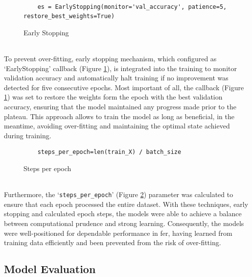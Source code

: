 \\
\begin{figure}[h!] 
    \centering
\begin{verbatim}
    es = EarlyStopping(monitor='val_accuracy', patience=5, restore_best_weights=True)
\end{verbatim}
    \caption{Early Stopping}
    \label{fig:earlystopping}
\end{figure}
\\
\indent To prevent over-fitting, early stopping mechanism, which configured as `EarlyStopping' callback (Figure \ref{fig:earlystopping}), is integrated into the training to monitor validation accuracy and automatically halt training if no improvement was detected for five consecutive epochs.
Most important of all, the callback (Figure \ref{fig:earlystopping}) was set to restore the weights form the epoch with the best validation accuracy, ensuring that the model maintained any progress made prior to the plateau.
This approach allows to train the model as long as beneficial, in the meantime, avoiding over-fitting and maintaining the optimal state achieved during training.
\\
\begin{figure}[h!] 
    \centering
\begin{verbatim}
    steps_per_epoch=len(train_X) / batch_size
\end{verbatim}
    \caption{Steps per epoch}
    \label{fig:steps_per_epoch}
\end{figure}
\\
\indent Furthermore, the `\texttt{steps\_per\_epoch}' (Figure \ref{fig:steps_per_epoch}) parameter was calculated to ensure that each epoch processed the entire dataset.
With these techniques, early stopping and calculated epoch steps, the models were able to achieve a balance between computational prudence and strong learning.
Consequently, the models were well-positioned for dependable performance in \gls{fer}, having learned from training data efficiently and been prevented from the risk of over-fitting. 
\subsection{Model Evaluation}

